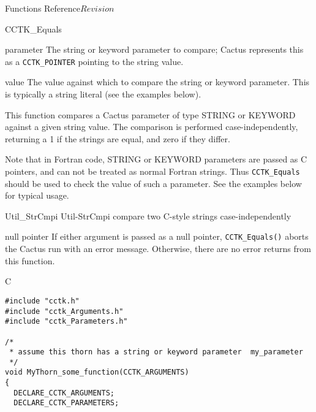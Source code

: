 \begin{cactuspart}{ Functions Reference}{}{$Revision$}
\begin{FunctionDescription}{CCTK\_Equals}
\begin{ParameterSection}
\begin{Parameter}{parameter}
The string or keyword parameter to compare; Cactus represents this
as a \verb|CCTK_POINTER| pointing to the string value.
\end{Parameter}
\begin{Parameter}{value}
The value against which to compare the string or keyword parameter.
This is typically a string literal (see the examples below).
\end{Parameter}
\end{ParameterSection}

\begin{Discussion}
This function compares a Cactus parameter of type STRING or KEYWORD against a
given string value. The comparison is performed case-independently,
returning a 1 if the strings are equal, and zero if they differ.

Note that in Fortran code, STRING or KEYWORD parameters are passed as C
pointers, and can not be treated as normal Fortran strings. Thus
\verb|CCTK_Equals| should be used to check the value of such a parameter.
See the examples below for typical usage.
\end{Discussion}

\begin{SeeAlsoSection}
\begin{SeeAlso2} {Util\_StrCmpi} {Util-StrCmpi}
compare two C-style strings case-independently
\end{SeeAlso2}
\end{SeeAlsoSection}

\begin{ErrorSection}
\begin{Error}{null pointer}
If either argument is passed as a null pointer, \verb|CCTK_Equals()|
aborts the Cactus run with an error message.  Otherwise, there are no
error returns from this function.
\end{Error}
\end{ErrorSection}

\begin{ExampleSection}
\begin{Example}{C}
\begin{verbatim}
#include "cctk.h"
#include "cctk_Arguments.h"
#include "cctk_Parameters.h"

/*
 * assume this thorn has a string or keyword parameter  my_parameter
 */
void MyThorn_some_function(CCTK_ARGUMENTS)
{
  DECLARE_CCTK_ARGUMENTS;
  DECLARE_CCTK_PARAMETERS;
  

\end{verbatim}
\end{Example}
\end{ExampleSection}
\end{FunctionDescription}
\end{cactuspart}

